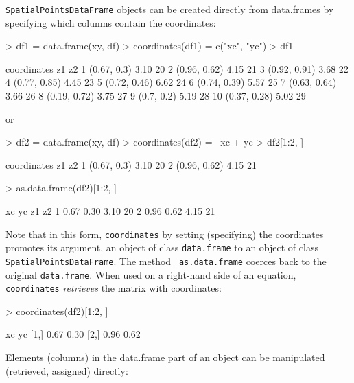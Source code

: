 \documentclass{article}
\begin{document}
{\tt SpatialPointsDataFrame} objects can be created directly from 
data.frames by specifying which columns contain the coordinates:
\begin{Schunk}
\begin{Sinput}
> df1 = data.frame(xy, df)
> coordinates(df1) = c("xc", "yc")
> df1
\end{Sinput}
\begin{Soutput}
    coordinates   z1 z2
1   (0.67, 0.3) 3.10 20
2  (0.96, 0.62) 4.15 21
3  (0.92, 0.91) 3.68 22
4  (0.77, 0.85) 4.45 23
5  (0.72, 0.46) 6.62 24
6  (0.74, 0.39) 5.57 25
7  (0.63, 0.64) 3.66 26
8  (0.19, 0.72) 3.75 27
9    (0.7, 0.2) 5.19 28
10 (0.37, 0.28) 5.02 29
\end{Soutput}
\end{Schunk}
or
\begin{Schunk}
\begin{Sinput}
> df2 = data.frame(xy, df)
> coordinates(df2) = ~xc + yc
> df2[1:2, ]
\end{Sinput}
\begin{Soutput}
   coordinates   z1 z2
1  (0.67, 0.3) 3.10 20
2 (0.96, 0.62) 4.15 21
\end{Soutput}
\begin{Sinput}
> as.data.frame(df2)[1:2, ]
\end{Sinput}
\begin{Soutput}
    xc   yc   z1 z2
1 0.67 0.30 3.10 20
2 0.96 0.62 4.15 21
\end{Soutput}
\end{Schunk}
Note that in this form, {\tt coordinates} by setting (specifying) the
coordinates promotes its argument, an object of class {\tt data.frame}
to an object of class {\tt SpatialPointsDataFrame}. The method {\tt
as.data.frame} coerces back to the original {\tt data.frame}. When used
on a right-hand side of an equation, {\tt coordinates} {\em retrieves}
the matrix with coordinates:
\begin{Schunk}
\begin{Sinput}
> coordinates(df2)[1:2, ]
\end{Sinput}
\begin{Soutput}
       xc   yc
[1,] 0.67 0.30
[2,] 0.96 0.62

\end{Soutput}
\end{Schunk}
Elements (columns) in the data.frame part of an object can be manipulated
(retrieved, assigned) directly:
\end{document}
